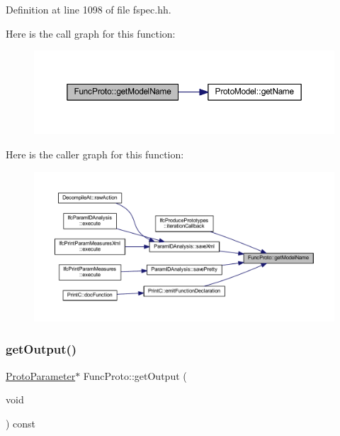 Definition at line 1098 of file fspec.\+hh.

Here is the call graph for this function\+:
\nopagebreak
\begin{figure}[H]
\begin{center}
\leavevmode
\includegraphics[width=350pt]{class_func_proto_abd50bddd2379651954a05e2015ab907e_cgraph}
\end{center}
\end{figure}
Here is the caller graph for this function\+:
\nopagebreak
\begin{figure}[H]
\begin{center}
\leavevmode
\includegraphics[width=350pt]{class_func_proto_abd50bddd2379651954a05e2015ab907e_icgraph}
\end{center}
\end{figure}
\mbox{\label{class_func_proto_a92e6871d7ee764e7c5aa8b10bf47705a}} 
\subsubsection{\texorpdfstring{getOutput()}{getOutput()}}
{\footnotesize\ttfamily \mbox{\hyperlink{class_proto_parameter}{Proto\+Parameter}}$\ast$ Func\+Proto\+::get\+Output (\begin{DoxyParamCaption}\item[{void}]{ }\end{DoxyParamCaption}) const\hspace{0.3cm}{\ttfamily [inline]}}



